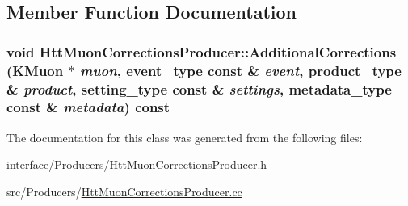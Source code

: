 \subsection{Member Function Documentation}
\hypertarget{classHttMuonCorrectionsProducer_a26afde578803c883482d80e0e1f6fa76}{
\subsubsection[{AdditionalCorrections}]{\setlength{\rightskip}{0pt plus 5cm}void HttMuonCorrectionsProducer::AdditionalCorrections (KMuon $\ast$ {\em muon}, \/  {\bf event\_\-type} const \& {\em event}, \/  {\bf product\_\-type} \& {\em product}, \/  {\bf setting\_\-type} const \& {\em settings}, \/  {\bf metadata\_\-type} const \& {\em metadata}) const}}
\label{classHttMuonCorrectionsProducer_a26afde578803c883482d80e0e1f6fa76}


The documentation for this class was generated from the following files:\begin{DoxyCompactItemize}
\item 
interface/Producers/\hyperlink{HttMuonCorrectionsProducer_8h}{HttMuonCorrectionsProducer.h}\item 
src/Producers/\hyperlink{HttMuonCorrectionsProducer_8cc}{HttMuonCorrectionsProducer.cc}\end{DoxyCompactItemize}
